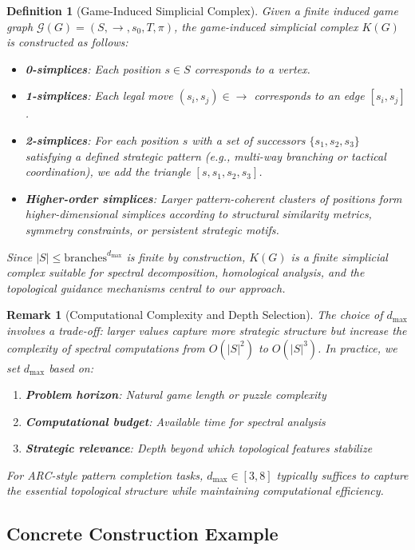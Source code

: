 \documentclass{article}
\newtheorem{definition}{Definition}
\newtheorem{remark}{Remark}
\begin{document}
\begin{definition}[Game-Induced Simplicial Complex]
Given a finite induced game graph $\mathcal{G}(G) = (S, \to, s_0, T, \pi)$, the game-induced simplicial complex $K(G)$ is constructed as follows:
\begin{itemize}
\item \textbf{0-simplices}: Each position $s \in S$ corresponds to a vertex.
\item \textbf{1-simplices}: Each legal move $(s_i, s_j) \in \to$ corresponds to an edge $[s_i, s_j]$.
\item \textbf{2-simplices}: For each position $s$ with a set of successors $\{s_1, s_2, s_3\}$ satisfying a defined strategic pattern (e.g., multi-way branching or tactical coordination), we add the triangle $[s, s_1, s_2, s_3]$.
\item \textbf{Higher-order simplices}: Larger pattern-coherent clusters of positions form higher-dimensional simplices according to structural similarity metrics, symmetry constraints, or persistent strategic motifs.
\end{itemize}
Since $|S| \leq \text{branches}^{d_{\max}}$ is finite by construction, $K(G)$ is a finite simplicial complex suitable for spectral decomposition, homological analysis, and the topological guidance mechanisms central to our approach.
\end{definition}

\begin{remark}[Computational Complexity and Depth Selection]
The choice of $d_{\max}$ involves a trade-off: larger values capture more strategic structure but increase the complexity of spectral computations from $O(|S|^2)$ to $O(|S|^3)$. In practice, we set $d_{\max}$ based on:
\begin{enumerate}
\item \textbf{Problem horizon}: Natural game length or puzzle complexity
\item \textbf{Computational budget}: Available time for spectral analysis  
\item \textbf{Strategic relevance}: Depth beyond which topological features stabilize
\end{enumerate}
For ARC-style pattern completion tasks, $d_{\max} \in [3, 8]$ typically suffices to capture the essential topological structure while maintaining computational efficiency.
\end{remark}

\subsection{Concrete Construction Example}
\end{document}
